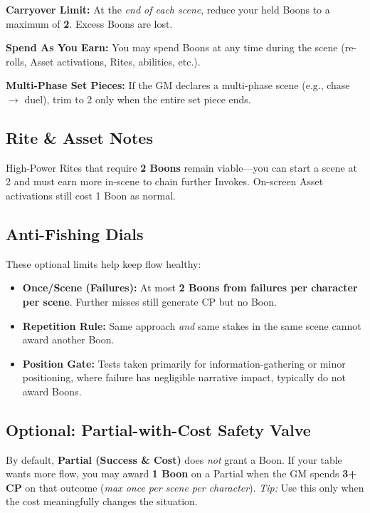 \textbf{Carryover Limit:} At the \emph{end of each scene}, reduce your held Boons to a maximum of \textbf{2}. Excess Boons are lost.

\textbf{Spend As You Earn:} You may spend Boons at any time during the scene (re-rolls, Asset activations, Rites, abilities, etc.).

\textbf{Multi-Phase Set Pieces:} If the GM declares a multi-phase scene (e.g., chase $\rightarrow$ duel), trim to 2 only when the entire set piece ends.

\subsection*{Rite \& Asset Notes}
High-Power Rites that require \textbf{2 Boons} remain viable—you can start a scene at 2 and must earn more in-scene to chain further Invokes. On-screen Asset activations still cost 1 Boon as normal.

\subsection*{Anti-Fishing Dials}
These optional limits help keep flow healthy:
\begin{itemize}
  \item \textbf{Once/Scene (Failures):} At most \textbf{2 Boons from failures per character per scene}. Further misses still generate CP but no Boon.
  \item \textbf{Repetition Rule:} Same approach \emph{and} same stakes in the same scene cannot award another Boon.
  \item \textbf{Position Gate:} Tests taken primarily for information-gathering or minor positioning, where failure has negligible narrative impact, typically do not award Boons.
\end{itemize}

\subsection*{Optional: Partial-with-Cost Safety Valve}
By default, \textbf{Partial (Success \& Cost)} does \emph{not} grant a Boon. If your table wants more flow, you may award \textbf{1 Boon} on a Partial when the GM spends \textbf{3+ CP} on that outcome (\emph{max once per scene per character}). \emph{Tip:} Use this only when the cost meaningfully changes the situation.

